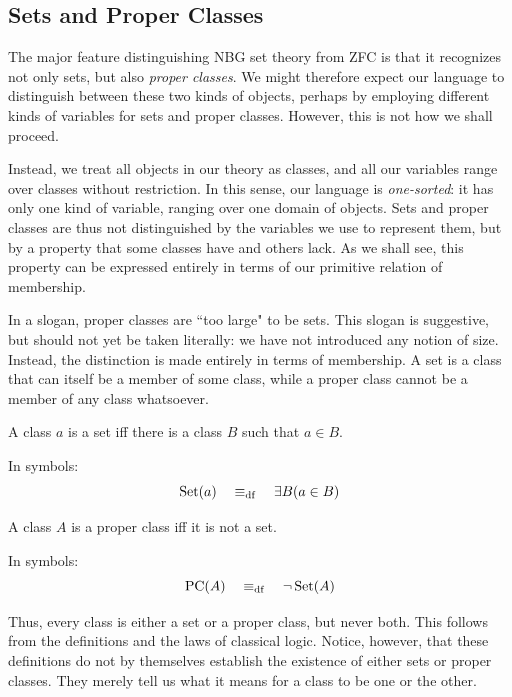 
\subsection{Sets and Proper Classes}

The major feature distinguishing NBG set theory from ZFC is that it recognizes not only sets, but also \textit{proper classes}. We might therefore expect our language to distinguish between these two kinds of objects, perhaps by employing different kinds of variables for sets and proper classes. However, this is not how we shall proceed.

Instead, we treat all objects in our theory as classes, and all our variables range over classes without restriction. In this sense, our language is \textit{one-sorted}: it has only one kind of variable, ranging over one domain of objects. Sets and proper classes are thus not distinguished by the variables we use to represent them, but by a property that some classes have and others lack. As we shall see, this property can be expressed entirely in terms of our primitive relation of membership.


In a slogan, proper classes are ``too large" to be sets. This slogan is suggestive, but should not yet be taken literally: we have not introduced any notion of size. Instead, the distinction is made entirely in terms of membership. A set is a class that can itself be a member of some class, while a proper class cannot be a member of any class whatsoever.

\begin{definition}[Set]\label{def:set}
    A class $a$ is a set iff there is a class $B$ such that $a \in B$.

    In symbols:
    \[
        \operatorname{Set}(a) \quad \mathrel{\equiv_{\mathrm{df}}} \quad \exists B(a \in B)
    \]
\end{definition}

\begin{definition}\label{def:proper-class}
    A class $A$ is a proper class iff it is not a set.

    In symbols:
    \[
        \operatorname{PC}(A) \quad \mathrel{\equiv_{\mathrm{df}}} \quad \neg\operatorname{Set}(A)
    \]
\end{definition}
\bookvspace{0.85em}

Thus, every class is either a set or a proper class, but never both. This follows from the definitions and the laws of classical logic. Notice, however, that these definitions do not by themselves establish the existence of either sets or proper classes. They merely tell us what it means for a class to be one or the other.


